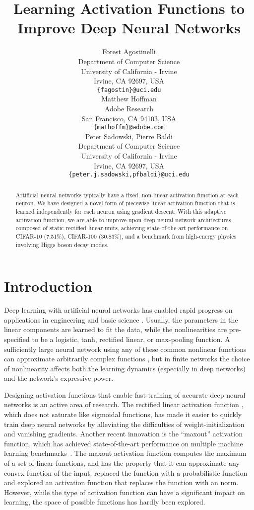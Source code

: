 \documentclass{article} \usepackage{iclr2015,times}
\title{Learning Activation Functions to Improve Deep Neural Networks}
\author{
Forest Agostinelli\\
Department of Computer Science\\
University of California - Irvine\\
Irvine, CA 92697, USA \\
\texttt{\{fagostin\}@uci.edu} \\
\And
Matthew Hoffman \\
Adobe Research \\
San Francisco, CA 94103, USA\\
\texttt{\{mathoffm\}@adobe.com} \\
\And
Peter Sadowski, Pierre Baldi\\
Department of Computer Science\\
University of California - Irvine\\
Irvine, CA 92697, USA \\
\texttt{\{peter.j.sadowski,pfbaldi\}@uci.edu} \\
}
\begin{document}
\maketitle

\begin{abstract}
Artificial neural networks typically have a fixed, non-linear activation function at each neuron. We have designed a novel form of piecewise linear activation function that is learned independently for each neuron using gradient descent. With this adaptive activation function, we are able to improve upon deep neural network architectures composed of static rectified linear units, achieving state-of-the-art performance on CIFAR-10 (7.51\%), CIFAR-100 (30.83\%), and a benchmark from high-energy physics involving Higgs boson decay modes.
\end{abstract}
 
\section{Introduction}

Deep learning with artificial neural networks has enabled rapid progress on applications in engineering \citep[e.g.,][]{krizhevsky2012imagenet, deepspeech} and basic science \citep[e.g.,][]{deepcontact2012, lusci2013deep, baldi2014searching}. Usually, the parameters in the linear components are learned to fit the data, while the nonlinearities are pre-specified to be a logistic, tanh, rectified linear, or max-pooling function.
A sufficiently large neural network using any of these common nonlinear functions can approximate arbitrarily complex functions \citep{hornik1989multilayer,cho2010arccos},
but in finite networks the choice of nonlinearity affects both the learning dynamics (especially in deep networks) and the network's expressive power.

Designing activation functions that enable fast training of accurate deep neural networks is an active area of research.
The rectified linear activation function \citep{jarrett2009best,glorot2011deep}, which does not saturate like sigmoidal functions, has made it easier to quickly train deep neural networks by alleviating the difficulties of weight-initialization and vanishing gradients. Another recent innovation is the ``maxout'' activation function, which has achieved state-of-the-art performance on multiple machine learning benchmarks~\citep{goodfellow2013maxout}. The maxout activation function computes the maximum of a set of linear functions, and has the property that it can approximate any convex function of the input. \citet{springenberg2013improving} replaced the  function with a probabilistic  function and \citet{gulcehre2014learned} explored an activation function that replaces the  function with an  norm. However, while the type of activation function can have a significant impact on learning, the space of possible functions has hardly been explored.
\end{document}
